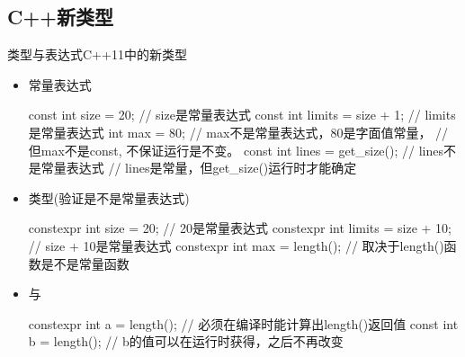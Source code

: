 \subsection[新类型]{C++新类型}
\begin{frame}[fragile]{类型与表达式}{C++11中的新类型}
  \stretchon
  \begin{itemize}
  \item 常量表达式\\
    \begin{minipage}{0.85\linewidth}
      \begin{cppcode}
const int size = 20;          // size是常量表达式
const int limits = size + 1;  // limits是常量表达式
int max = 80;                 // max不是常量表达式，80是字面值常量，
                              // 但max不是const, 不保证运行是不变。
const int lines = get_size(); // lines不是常量表达式
                              // lines是常量，但get_size()运行时才能确定
      \end{cppcode}
    \end{minipage}
  \item  {}类型(验证是不是常量表达式)\\
     \begin{minipage}{0.85\linewidth}
      \begin{cppcode}
constexpr int size = 20;           // 20是常量表达式
constexpr int limits = size + 10;  // size + 10是常量表达式
constexpr int max = length();      // 取决于length()函数是不是常量函数
      \end{cppcode}
    \end{minipage}
  \item {}与\\
    \begin{minipage}{0.85\linewidth}
      \begin{cppcode}
constexpr int a = length(); // 必须在编译时能计算出length()返回值
const int b = length();     // b的值可以在运行时获得，之后不再改变
      \end{cppcode}
    \end{minipage}
  \end{itemize}
  \stretchoff
\end{frame}

